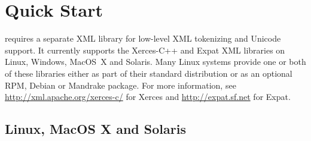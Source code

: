 \documentclass{sbmlmanual}
\begin{document}


\author{Ben Bornstein}


\address{The SBML Team\\
  Control and Dynamical Systems, MC 107-81\\
  California Institute of Technology, Pasadena, CA 91125, USA\\[2pt]
  {\url{http://www.sbml.org/}}}

\funding{\libsbmlfunding{}}

\date{\today{}\\[10pt]\hspace*{-1ex}\libsbml{} Version \libsbmlversion{}}

\maketitlepage


\section{Quick Start}
\label{sec:quickstart-unix}

\libsbml{} requires a separate XML library for low-level XML tokenizing and
Unicode support.  It currently supports the Xerces-C++ and Expat XML
libraries on Linux, Windows, MacOS~X and Solaris.  Many Linux systems
provide one or both of these libraries either as part of their standard
distribution or as an optional RPM, Debian or Mandrake package.  For more
information, see \url{http://xml.apache.org/xerces-c/} for Xerces and
\url{http://expat.sf.net} for Expat.

\subsection{Linux, MacOS X and Solaris}
\end{document}
